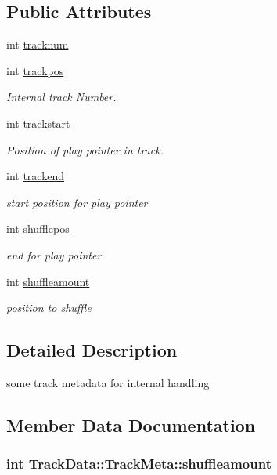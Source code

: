 \subsection*{Public Attributes}
\begin{DoxyCompactItemize}
\item 
int \hyperlink{structTrackData_1_1TrackMeta_af4a668881dcc2a0eaa77a7a40c07218d}{tracknum}
\item 
int \hyperlink{structTrackData_1_1TrackMeta_a9f41134545f6acf51d3a77f701a66d5d}{trackpos}
\begin{DoxyCompactList}\small\item\em Internal track Number. \end{DoxyCompactList}\item 
int \hyperlink{structTrackData_1_1TrackMeta_aed3a7875e7d4443b153d62fddb4517ab}{trackstart}
\begin{DoxyCompactList}\small\item\em Position of play pointer in track. \end{DoxyCompactList}\item 
int \hyperlink{structTrackData_1_1TrackMeta_a0e9f7dbe510b3496b63433647448e5b9}{trackend}
\begin{DoxyCompactList}\small\item\em start position for play pointer \end{DoxyCompactList}\item 
int \hyperlink{structTrackData_1_1TrackMeta_ac7e253adf32b1a271dfe2d527a299e36}{shufflepos}
\begin{DoxyCompactList}\small\item\em end for play pointer \end{DoxyCompactList}\item 
int \hyperlink{structTrackData_1_1TrackMeta_a06dbf7e8f2ef1022addc2ff2396df6a4}{shuffleamount}
\begin{DoxyCompactList}\small\item\em position to shuffle \end{DoxyCompactList}\end{DoxyCompactItemize}


\subsection{Detailed Description}
some track metadata for internal handling 

\subsection{Member Data Documentation}
\hypertarget{structTrackData_1_1TrackMeta_a06dbf7e8f2ef1022addc2ff2396df6a4}{
\subsubsection[{shuffleamount}]{\setlength{\rightskip}{0pt plus 5cm}int Track\-Data\-::\-Track\-Meta\-::shuffleamount}}\label{structTrackData_1_1TrackMeta_a06dbf7e8f2ef1022addc2ff2396df6a4}


